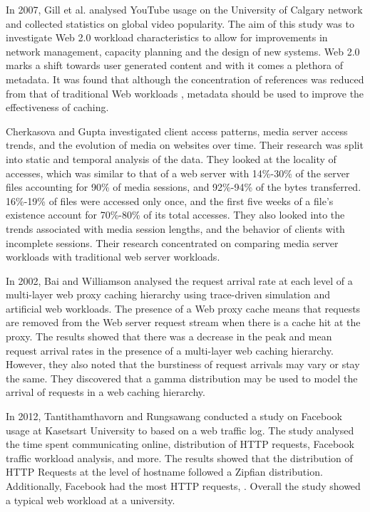 \documentclass[10pt,conference]{IEEEtran}
\begin{document}
In 2007, Gill et al. \cite{youtube} analysed YouTube usage on the University of Calgary network and collected statistics on global video popularity. The aim of this study was to investigate Web 2.0 workload characteristics to allow for improvements in network management, capacity planning and the design of new systems. Web 2.0 marks a shift towards user generated content and with it comes a plethora of metadata. It was found that although the concentration of references was reduced from that of traditional Web workloads \cite{keynote}, metadata should be used to improve the effectiveness of caching.

Cherkasova and Gupta \cite{Cherkasova} investigated client access patterns, media server access trends, and the evolution of media on websites over time. Their research was split into static and temporal analysis of the data. They looked at the locality of accesses, which was similar to that of a web server with 14\%-30\% of the server files accounting for 90\% of media sessions, and 92\%-94\% of the bytes transferred. 16\%-19\% of files were accessed only once, and the first five weeks of a file’s existence account for 70\%-80\% of its total accesses. They also looked into the trends associated with media session lengths, and the behavior of clients with incomplete sessions. Their research concentrated on comparing media server workloads with traditional web server workloads.

In 2002, Bai and Williamson \cite{Bai} analysed the request arrival rate at each level of a multi-layer web proxy caching hierarchy using trace-driven simulation and artificial web workloads. The presence of a Web proxy cache means that requests are removed from the Web server request stream when there is a cache hit at the proxy. The results showed that there was a decrease in the peak and mean request arrival rates in the presence of a multi-layer web caching hierarchy. However, they also noted that the burstiness of request arrivals may vary or stay the same. They discovered that a gamma distribution may be used to model the arrival of requests in a web caching hierarchy.

In 2012, Tantithamthavorn and Rungsawang \cite{facebook} conducted a study on Facebook usage at Kasetsart University to based on a web traffic log. The study analysed the time spent communicating online, distribution of HTTP requests, Facebook traffic workload analysis, and more. The results showed that the distribution of HTTP Requests at the level of hostname followed a Zipfian distribution. Additionally, Facebook had the most HTTP requests, . Overall the study showed a typical web workload at a university.
\end{document}
